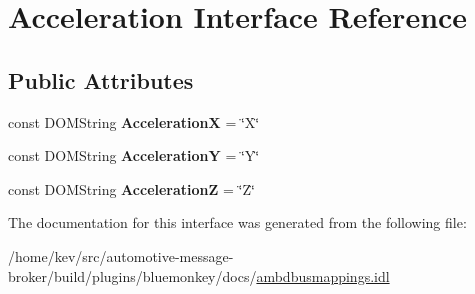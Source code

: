 \hypertarget{interfaceAcceleration}{\section{Acceleration Interface Reference}
\label{interfaceAcceleration}
}
\subsection*{Public Attributes}
\begin{DoxyCompactItemize}
\item 
\hypertarget{interfaceAcceleration_afd949d9a607325dd663e5a96d9414341}{const D\+O\+M\+String {\bfseries Acceleration\+X} = \char`\"{}X\char`\"{}}\label{interfaceAcceleration_afd949d9a607325dd663e5a96d9414341}

\item 
\hypertarget{interfaceAcceleration_a92b772ac8f46b38f759f0657337371f1}{const D\+O\+M\+String {\bfseries Acceleration\+Y} = \char`\"{}Y\char`\"{}}\label{interfaceAcceleration_a92b772ac8f46b38f759f0657337371f1}

\item 
\hypertarget{interfaceAcceleration_acf61a6e0209c256b838ce995554be1b9}{const D\+O\+M\+String {\bfseries Acceleration\+Z} = \char`\"{}Z\char`\"{}}\label{interfaceAcceleration_acf61a6e0209c256b838ce995554be1b9}

\end{DoxyCompactItemize}


The documentation for this interface was generated from the following file\+:\begin{DoxyCompactItemize}
\item 
/home/kev/src/automotive-\/message-\/broker/build/plugins/bluemonkey/docs/\hyperlink{ambdbusmappings_8idl}{ambdbusmappings.\+idl}\end{DoxyCompactItemize}
